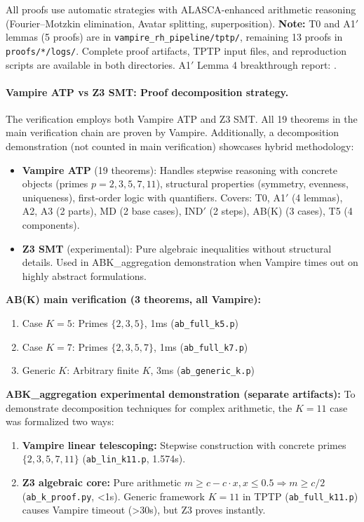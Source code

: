 \vspace{1ex}
All proofs use automatic strategies with ALASCA-enhanced arithmetic reasoning (Fourier--Motzkin elimination, Avatar splitting, superposition). \textbf{Note:} T0 and A1$'$ lemmas (5 proofs) are in \texttt{vampire\_rh\_pipeline/tptp/}, remaining 13 proofs in \texttt{proofs/*/logs/}. Complete proof artifacts, TPTP input files, and reproduction scripts are available in both directories. A1$'$ Lemma 4 breakthrough report: .

\paragraph{Vampire ATP vs Z3 SMT: Proof decomposition strategy.}
The verification employs both Vampire ATP and Z3 SMT. All 19 theorems in the main verification chain are proven by Vampire. Additionally, a decomposition demonstration (not counted in main verification) showcases hybrid methodology:
\begin{itemize}
  \item \textbf{Vampire ATP} (19 theorems): Handles stepwise reasoning with concrete objects (primes $p=2,3,5,7,11$), structural properties (symmetry, evenness, uniqueness), first-order logic with quantifiers. Covers: T0, A1$'$ (4 lemmas), A2, A3 (2 parts), MD (2 base cases), IND$'$ (2 steps), AB(K) (3 cases), T5 (4 components).
  \item \textbf{Z3 SMT} (experimental): Pure algebraic inequalities without structural details. Used in ABK\_aggregation demonstration when Vampire times out on highly abstract formulations.
\end{itemize}
\textbf{AB(K) main verification (3 theorems, all Vampire):}
\begin{enumerate}
  \item Case $K=5$: Primes $\{2,3,5\}$, 1ms (\texttt{ab\_full\_k5.p})
  \item Case $K=7$: Primes $\{2,3,5,7\}$, 1ms (\texttt{ab\_full\_k7.p})
  \item Generic $K$: Arbitrary finite $K$, 3ms (\texttt{ab\_generic\_k.p})
\end{enumerate}
\textbf{ABK\_aggregation experimental demonstration (separate artifacts):} To demonstrate decomposition techniques for complex arithmetic, the $K=11$ case was formalized two ways:
\begin{enumerate}
  \item \textbf{Vampire linear telescoping:} Stepwise construction with concrete primes $\{2,3,5,7,11\}$ (\texttt{ab\_lin\_k11.p}, 1.574s).
  \item \textbf{Z3 algebraic core:} Pure arithmetic $m\ge c - c\cdot x, x\le 0.5 \Rightarrow m\ge c/2$ (\texttt{ab\_k\_proof.py}, <1s). Generic framework $K=11$ in TPTP (\texttt{ab\_full\_k11.p}) causes Vampire timeout (>30s), but Z3 proves instantly.
\end{enumerate}
